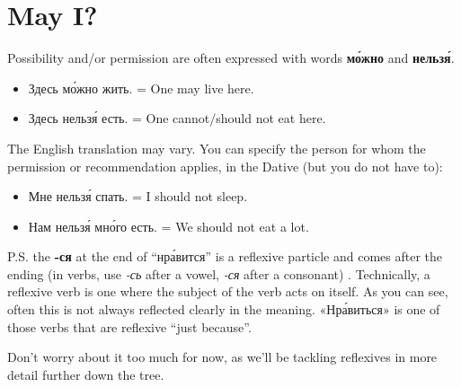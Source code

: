 \section{May I?}\label{may-i}

Possibility and/or permission are often expressed with words
\textbf{м\'{о}жно} and \textbf{нельз\'{я}}.

\begin{itemize}
\tightlist
\item
  Здесь м\'{о}жно жить. = One may live here.
\item
  Здесь нельз\'{я} есть. = One cannot/should not eat here.
\end{itemize}

The English translation may vary. You can specify the person for whom
the permission or recommendation applies, in the Dative (but you do not
have to):

\begin{itemize}
\tightlist
\item
  Мне нельз\'{я} спать. = I should not sleep.
\item
  Нам нельз\'{я} мн\'{о}го есть. = We should not eat a lot.
\end{itemize}

P.S. the \textbf{-ся} at the end of ``нр\'{а}вится'' is a reflexive particle
and comes after the ending (in verbs, use \emph{-сь} after a vowel,
\emph{-ся} after a consonant) . Technically, a reflexive verb is one
where the subject of the verb acts on itself. As you can see, often this
is not always reflected clearly in the meaning. «Нр\'{а}виться» is one of
those verbs that are reflexive ``just because''.

Don't worry about it too much for now, as we'll be tackling reflexives
in more detail further down the tree.

